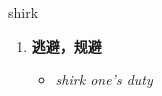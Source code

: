 
\begin{frame}
{\huge shirk}
\begin{center}
\begin{enumerate}\Large
  \item \textbf{逃避，规避}
  \begin{itemize}
    \item \em{\Large{shirk one's duty}}
  \end{itemize}
\end{enumerate}
\end{center}
\end{frame}

